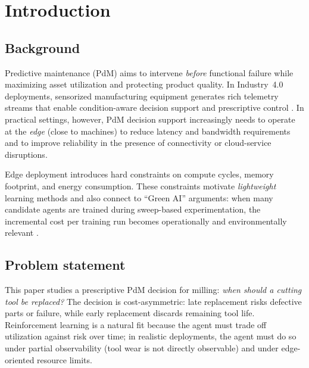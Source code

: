\documentclass[sn-basic]{sn-jnl} %
\begin{document}

\maketitle

\section{Introduction}
\subsection{Background}
Predictive maintenance (PdM) aims to intervene \emph{before} functional failure while maximizing asset utilization and protecting product quality. In Industry~4.0 deployments, sensorized manufacturing equipment generates rich telemetry streams that enable condition-aware decision support and prescriptive control \cite{Zonta2020, Compare2020}. In practical settings, however, PdM decision support increasingly needs to operate at the \emph{edge} (close to machines) to reduce latency and bandwidth requirements and to improve reliability in the presence of connectivity or cloud-service disruptions.

Edge deployment introduces hard constraints on compute cycles, memory footprint, and energy consumption. These constraints motivate \emph{lightweight} learning methods and also connect to ``Green AI'' arguments: when many candidate agents are trained during sweep-based experimentation, the incremental cost per training run becomes operationally and environmentally relevant \cite{Schwartz2020, Strubell2019}.

\subsection{Problem statement}
This paper studies a prescriptive PdM decision for milling: \emph{when should a cutting tool be replaced?} The decision is cost-asymmetric: late replacement risks defective parts or failure, while early replacement discards remaining tool life. Reinforcement learning is a natural fit because the agent must trade off utilization against risk over time; in realistic deployments, the agent must do so under partial observability (tool wear is not directly observable) and under edge-oriented resource limits.
\end{document}
